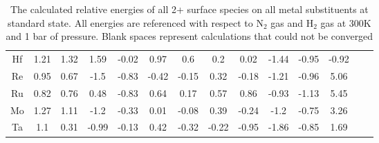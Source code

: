 \begin{table}
\begin{center}
\begin{tabular}{| c | c | c | c | c | c | c | c | c | c | c | c | c | c |}
Hf & 1.21 & 1.32 & 1.59 & -0.02 & 0.97 & 0.6 & 0.2 & 0.02 & -1.44 & -0.95 & -0.92 \\
Re & 0.95 & 0.67 & -1.5 & -0.83 & -0.42 & -0.15 & 0.32 & -0.18 & -1.21 & -0.96 & 5.06 \\
Ru & 0.82 & 0.76 & 0.48 & -0.83 & 0.64 & 0.17 & 0.57 & 0.86 & -0.93 & -1.13 & 5.45 \\
Mo & 1.27 & 1.11 & -1.2 & -0.33 & 0.01 & -0.08 & 0.39 & -0.24 & -1.2 & -0.75 & 3.26 \\
Ta & 1.1 & 0.31 & -0.99 & -0.13 & 0.42 & -0.32 & -0.22 & -0.95 & -1.86 & -0.85 & 1.69 \\
\hline
\end{tabular}
\end{center}
\caption{The calculated relative energies of all 2+ surface species on all metal substituents at standard state. All energies are referenced with respect to N$_2$ gas and H$_2$ gas at 300K and 1 bar of pressure. Blank spaces represent calculations that could not be converged}
\label{table:energies}
\end{table}

